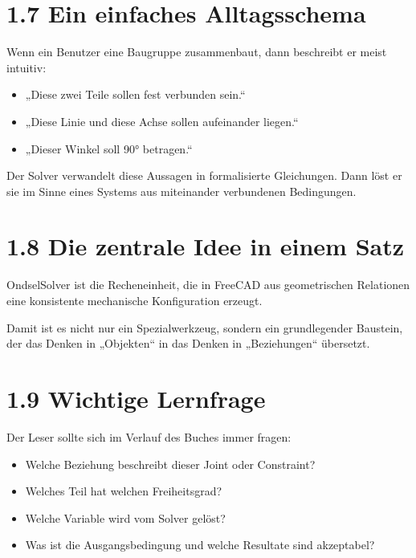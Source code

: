 \documentclass[
  12pt
]{book}
\providecommand{\tightlist}{%
  \setlength{\itemsep}{0pt}\setlength{\parskip}{0pt}}
\begin{document}
\hypertarget{ein-einfaches-alltagsschema}{%
\section{\texorpdfstring{{1.7} Ein einfaches
Alltagsschema}{1.7 Ein einfaches Alltagsschema}}\label{ein-einfaches-alltagsschema}}

Wenn ein Benutzer eine Baugruppe zusammenbaut, dann beschreibt er meist
intuitiv:

\begin{itemize}
\tightlist
\item
  „Diese zwei Teile sollen fest verbunden sein.``
\item
  „Diese Linie und diese Achse sollen aufeinander liegen.``
\item
  „Dieser Winkel soll 90° betragen.``
\end{itemize}

Der Solver verwandelt diese Aussagen in formalisierte Gleichungen. Dann
löst er sie im Sinne eines Systems aus miteinander verbundenen
Bedingungen.

\hypertarget{die-zentrale-idee-in-einem-satz}{%
\section{\texorpdfstring{{1.8} Die zentrale Idee in einem
Satz}{1.8 Die zentrale Idee in einem Satz}}\label{die-zentrale-idee-in-einem-satz}}

OndselSolver ist die Recheneinheit, die in FreeCAD aus geometrischen
Relationen eine konsistente mechanische Konfiguration erzeugt.

Damit ist es nicht nur ein Spezialwerkzeug, sondern ein grundlegender
Baustein, der das Denken in „Objekten`` in das Denken in „Beziehungen``
übersetzt.

\hypertarget{wichtige-lernfrage}{%
\section{\texorpdfstring{{1.9} Wichtige
Lernfrage}{1.9 Wichtige Lernfrage}}\label{wichtige-lernfrage}}

Der Leser sollte sich im Verlauf des Buches immer fragen:

\begin{itemize}
\tightlist
\item
  Welche Beziehung beschreibt dieser Joint oder Constraint?
\item
  Welches Teil hat welchen Freiheitsgrad?
\item
  Welche Variable wird vom Solver gelöst?
\item
  Was ist die Ausgangsbedingung und welche Resultate sind akzeptabel?
\end{itemize}
\end{document}
